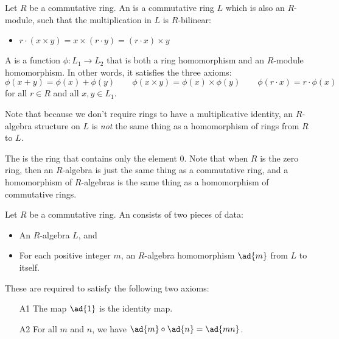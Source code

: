 \documentclass[a4paper]{article}
\begin{document}
\begin{definition}
Let $R$ be a commutative ring. An  is a commutative ring $L$ which is also an $R$-module, such that the multiplication in $L$ is $R$-bilinear:
\begin{itemize}
\item $ r\cdot(x \times y) = x \times (r \cdot y) = (r \cdot x) \times y  $
\end{itemize}
A  is a function $\phi: L_1 \to L_2$ that is both a ring homomorphism and an $R$-module homomorphism. In other words, it satisfies the three axioms:
$$ \phi(x+y) = \phi(x) + \phi(y) \qquad \phi(x \times y) = \phi(x) \times \phi(y)  \qquad \phi(r \cdot x) = r  \cdot \phi(x)$$
for all $r \in R$ and all $x, y \in L_1$.

\end{definition}

\begin{remark}
Note that because we don't require rings to have a multiplicative identity, an $R$-algebra structure on $L$ is \emph{not} the same thing as a homomorphism of rings from $R$ to $L$. 
\end{remark}


\begin{remark}
The  is the ring that contains only the element $0$. Note that when $R$ is the zero ring, then an $R$-algebra is just the same thing as a commutative ring, and a homomorphism of $R$-algebras is the same thing as a homomorphism of commutative rings.
\end{remark}


\begin{definition}
Let $R$ be a commutative ring. An  consists of two pieces of data:
\begin{itemize}
\item An $R$-algebra $L$, and
\item For each positive integer $m$, an $R$-algebra homomorphism $\ad{m}$ from $L$ to itself.
\end{itemize}
These are required to satisfy the following two axioms:

\begin{itemize}
\item[A1] The map $\ad{1}$ is the identity map.
\item[A2] For all $m$ and $n$, we have $\ad{m} \circ \ad{n} = \ad{mn}$.
\end{itemize}
\end{definition}
\end{document}
